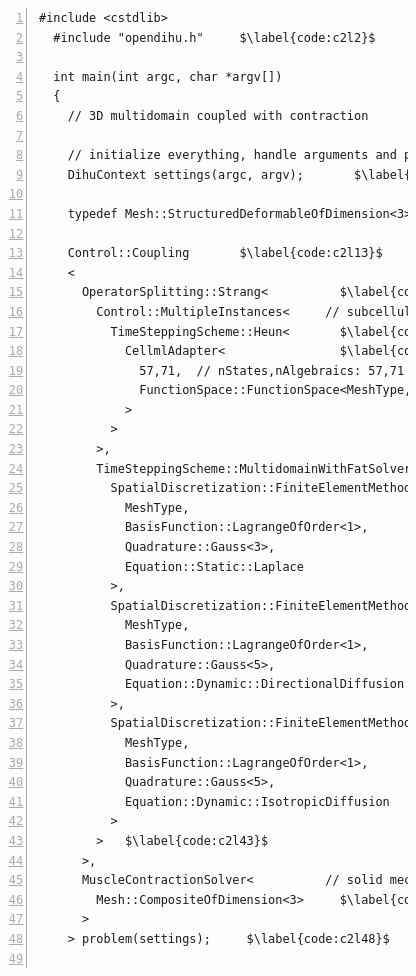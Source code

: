 \begin{figure}
\centering
\begin{framed}
\begin{lstlisting}[basicstyle=\scriptsize\ttfamily,commentstyle=\color{gray},numbers=left]
  #include <cstdlib>
  #include "opendihu.h"     $\label{code:c2l2}$

  int main(int argc, char *argv[])
  {
    // 3D multidomain coupled with contraction
    
    // initialize everything, handle arguments and parse settings from input file
    DihuContext settings(argc, argv);       $\label{code:c2l9}$
    
    typedef Mesh::StructuredDeformableOfDimension<3> MeshType;    $\label{code:c2l11}$

    Control::Coupling       $\label{code:c2l13}$
    <
      OperatorSplitting::Strang<          $\label{code:c2l15}$
        Control::MultipleInstances<     // subcellular model  $\label{code:c2l16}$      
          TimeSteppingScheme::Heun<       $\label{code:c2l17}$
            CellmlAdapter<                $\label{code:c2l18}$
              57,71,  // nStates,nAlgebraics: 57,71 = Shorten, 4,9 = Hodgkin Huxley     $\label{code:c2l19}$
              FunctionSpace::FunctionSpace<MeshType,BasisFunction::LagrangeOfOrder<1>>  $\label{code:c2l20}$
            >  
          >
        >,
        TimeSteppingScheme::MultidomainWithFatSolver<       // multidomain    $\label{code:c2l24}$
          SpatialDiscretization::FiniteElementMethod<       // FEM for initial potential flow    $\label{code:c2l25}$
            MeshType,                                       $\label{code:c2l26}$
            BasisFunction::LagrangeOfOrder<1>,
            Quadrature::Gauss<3>,
            Equation::Static::Laplace                            $\label{code:c2l29}$
          >,
          SpatialDiscretization::FiniteElementMethod<       // anisotropic conduction      $\label{code:c2l31}$
            MeshType,                                            $\label{code:c2l32}$
            BasisFunction::LagrangeOfOrder<1>,
            Quadrature::Gauss<5>,
            Equation::Dynamic::DirectionalDiffusion
          >,
          SpatialDiscretization::FiniteElementMethod<       // isotropic conduction in fat layer     $\label{code:c2l37}$
            MeshType,                                             $\label{code:c2l38}$
            BasisFunction::LagrangeOfOrder<1>,
            Quadrature::Gauss<5>,
            Equation::Dynamic::IsotropicDiffusion
          >
        >   $\label{code:c2l43}$
      >,
      MuscleContractionSolver<          // solid mechanics $\label{code:c2l45}$
        Mesh::CompositeOfDimension<3>     $\label{code:c2l46}$
      >
    > problem(settings);     $\label{code:c2l48}$
    

\end{lstlisting}
\end{framed}
\end{figure}
